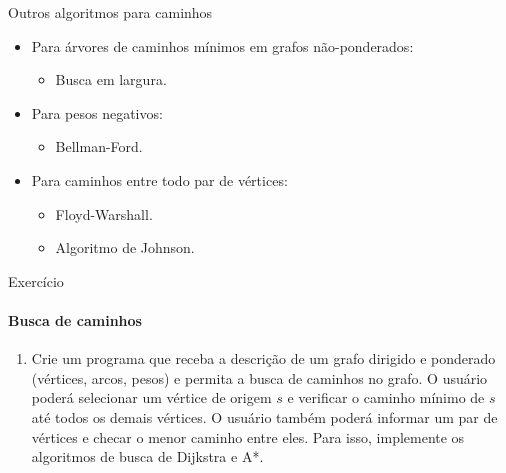 \begin{frame}{Outros algoritmos para caminhos}

\begin{itemize}
	\item Para árvores de caminhos mínimos em grafos não-ponderados:
	\begin{itemize}
		\item Busca em largura.
	\end{itemize}
	
	\item Para pesos negativos: 
	\begin{itemize}
		\item Bellman-Ford.
	\end{itemize}
	
	\item Para caminhos entre todo par de vértices: 
	\begin{itemize}
		\item Floyd-Warshall.
		\item Algoritmo de Johnson.
	\end{itemize}
	
\end{itemize}
\end{frame}



\begin{frame}{Exercício}
	\framesubtitle{Busca de caminhos}
	
	\begin{enumerate}
		\item Crie um programa que receba a descrição de um grafo dirigido e ponderado (vértices, arcos, pesos) e permita a busca de caminhos no grafo. O usuário poderá selecionar um vértice de origem $s$ e verificar o caminho mínimo de $s$ até todos os demais vértices. O usuário também poderá informar um par de vértices e checar o menor caminho entre eles. Para isso, implemente os algoritmos de busca de Dijkstra e A*.
	\end{enumerate}
\end{frame}



